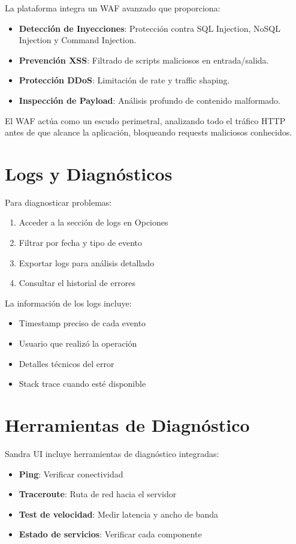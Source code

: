 La plataforma integra un WAF avanzado que proporciona:

\begin{itemize}
\item \textbf{Detección de Inyecciones}: Protección contra SQL Injection, NoSQL Injection y Command Injection.
\item \textbf{Prevención XSS}: Filtrado de scripts maliciosos en entrada/salida.
\item \textbf{Protección DDoS}: Limitación de rate y traffic shaping.
\item \textbf{Inspección de Payload}: Análisis profundo de contenido malformado.
\end{itemize}

El WAF actúa como un escudo perimetral, analizando todo el tráfico HTTP antes de que alcance la aplicación, bloqueando requests maliciosos conhecidos.

\section{Logs y Diagnósticos}

Para diagnosticar problemas:

\begin{enumerate}
    \item Acceder a la sección de logs en Opciones
    \item Filtrar por fecha y tipo de evento
    \item Exportar logs para análisis detallado
    \item Consultar el historial de errores
\end{enumerate}

La información de los logs incluye:

\begin{itemize}
    \item Timestamp preciso de cada evento
    \item Usuario que realizó la operación
    \item Detalles técnicos del error
    \item Stack trace cuando esté disponible
\end{itemize}

\section{Herramientas de Diagnóstico}

Sandra UI incluye herramientas de diagnóstico integradas:

\begin{itemize}
    \item \textbf{Ping}: Verificar conectividad
    \item \textbf{Traceroute}: Ruta de red hacia el servidor
    \item \textbf{Test de velocidad}: Medir latencia y ancho de banda
    \item \textbf{Estado de servicios}: Verificar cada componente
\end{itemize}

\clearpage
